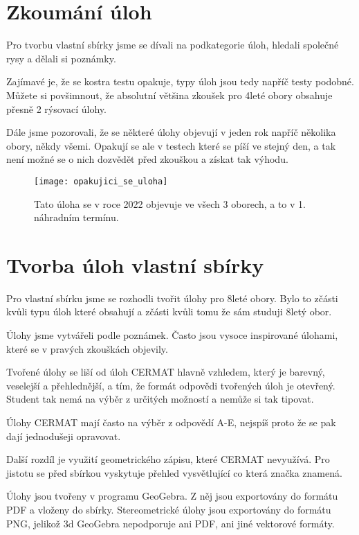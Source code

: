 

\section{Zkoumání úloh}

Pro tvorbu vlastní sbírky jsme se dívali na podkategorie úloh, hledali společné rysy a dělali si poznámky.

Zajímavé je, že se kostra testu opakuje, typy úloh jsou tedy napříč testy podobné. Můžete si povšimnout, že absolutní většina zkoušek pro 4leté obory obsahuje přesně 2 rýsovací úlohy.

Dále jsme pozorovali, že se některé úlohy objevují v jeden rok napříč několika obory, někdy všemi. Opakují se ale v testech které se píší ve stejný den, a tak není možné se o nich dozvědět před zkouškou a získat tak výhodu.


\begin{figure}[h]
	\caption{Tato úloha se v roce 2022 objevuje ve všech 3 oborech, a to v 1. náhradním termínu.}
	\centering
	\texttt{[image: opakujici\_se\_uloha]}
\end{figure}

\section{Tvorba úloh vlastní sbírky}

Pro vlastní sbírku jsme se rozhodli tvořit úlohy pro 8leté obory. Bylo to zčásti kvůli typu úloh které obsahují a zčásti kvůli tomu že sám studuji 8letý obor.

Úlohy jsme vytvářeli podle poznámek. Často jsou vysoce inspirované úlohami, které se v pravých zkouškách objevily.

Tvořené úlohy se liší od úloh CERMAT hlavně vzhledem, který je barevný, veselejší a přehlednější, a tím, že formát odpovědi tvořených úloh je otevřený. Student tak nemá na výběr z určitých možností a nemůže si tak tipovat.

Úlohy CERMAT mají často na výběr z odpovědí A-E, nejspíš proto že se pak dají jednodušeji opravovat.

Další rozdíl je využití geometrického zápisu, které CERMAT nevyužívá. Pro jistotu se před sbírkou vyskytuje přehled vysvětlující co která značka znamená.

Úlohy jsou tvořeny v programu GeoGebra. Z něj jsou exportovány do formátu PDF a vloženy do sbírky. Stereometrické úlohy jsou exportovány do formátu PNG, jelikož 3d GeoGebra nepodporuje ani PDF, ani jiné vektorové formáty.
